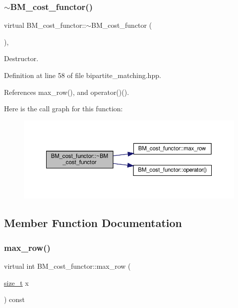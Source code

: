 \subsubsection{\texorpdfstring{$\sim$\+B\+M\+\_\+cost\+\_\+functor()}{~BM\_cost\_functor()}}
{\footnotesize\ttfamily virtual B\+M\+\_\+cost\+\_\+functor\+::$\sim$\+B\+M\+\_\+cost\+\_\+functor (\begin{DoxyParamCaption}{ }\end{DoxyParamCaption})\hspace{0.3cm}{\ttfamily [inline]}, {\ttfamily [virtual]}}



Destructor. 



Definition at line 58 of file bipartite\+\_\+matching.\+hpp.



References max\+\_\+row(), and operator()().

Here is the call graph for this function\+:
\nopagebreak
\begin{figure}[H]
\begin{center}
\leavevmode
\includegraphics[width=350pt]{de/d28/structBM__cost__functor_a14e835ab9c43aaafa40b5df529ff771b_cgraph}
\end{center}
\end{figure}


\subsection{Member Function Documentation}
\mbox{\label{structBM__cost__functor_a40632938a246de559ee24def934ed08d}} 
\subsubsection{\texorpdfstring{max\+\_\+row()}{max\_row()}}
{\footnotesize\ttfamily virtual int B\+M\+\_\+cost\+\_\+functor\+::max\+\_\+row (\begin{DoxyParamCaption}\item[{\hyperlink{tutorial__fpt__2017_2intro_2sixth_2test_8c_a7c94ea6f8948649f8d181ae55911eeaf}{size\+\_\+t}}]{x }\end{DoxyParamCaption}) const\hspace{0.3cm}{\ttfamily [pure virtual]}}



